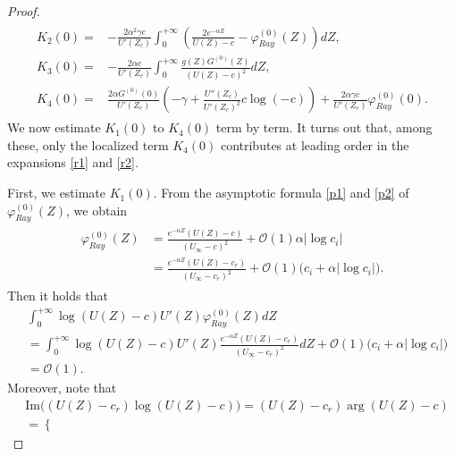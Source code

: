 \documentclass[10pt,a4paper]{amsart}
\begin{document}
\begin{proof}
\begin{align}
\begin{aligned}
					K_2(0)= &-\frac{2\alpha^2\gamma c}{U'(Z_c)}\int_{0}^{+\infty}\left(\frac{2e^{-\alpha Z}}{U(Z)-c}-\varphi_{Ray}^{(0)}(Z)\right)dZ,\\
					K_3(0)=&-\frac{2\alpha c}{U'(Z_c)}\int_{0}^{+\infty}\frac{g(Z)G^{(0)}(Z)}{(U(Z)-c)^2}dZ,\\
					K_4(0) =& \frac{2\alpha G^{(0)}(0)}{U'(Z_c)}\left(-\gamma+\frac{U''(Z_c)}{U'(Z_c)^2}c\log(-c)\right)
					+\frac{2\alpha\gamma c}{U'(Z_c)}\varphi_{Ray}^{(0)}(0).\nonumber
			\end{aligned}\end{align}
		We now estimate $K_1(0)$ to $K_4(0)$ term by term. It turns out that, among these, only the localized term $K_4(0)$ contributes at leading order in the expansions \eqref{r1} and \eqref{r2}.
		
	 First, we estimate $K_1(0)$.  From the asymptotic formula \eqref{p1} and \eqref{p2} of $\varphi^{(0)}_{Ray}(Z)$, we obtain 
			\begin{align}\begin{aligned}
					\varphi_{Ray}^{(0)}(Z)&=\frac{e^{-\alpha Z}(U(Z)-c)}{(U_\infty-c)^2}+\mathcal{O}(1)\alpha|\log c_i|\\
					&=\frac{e^{-\alpha Z}(U(Z)-c_r)}{(U_\infty-c_r)^2}+\mathcal{O}(1)\big(c_i+\alpha|\log c_i|\big).\nonumber
			\end{aligned}\end{align}
		Then it holds that
			\begin{align*}
				&\int_{0}^{+\infty}\log(U(Z)-c) U'(Z)\varphi_{Ray}^{(0)}(Z)dZ\\
				&= \int_{0}^{+\infty}\log(U(Z)-c) U'(Z)\frac{e^{-\alpha Z}(U(Z)-c_r)}{(U_\infty-c_r)^2}dZ+\mathcal{O}(1)\big(c_i+\alpha |\log c_i|\big)\\
				&=\mathcal{O}(1).
			\end{align*}
			Moreover, note that
			\begin{align*}
				&\text{Im}\Big((U(Z)-c_r)\log(U(Z)-c)\Big)= (U(Z)-c_r)\arg(U(Z)-c)\\
				&=\begin{cases}

\end{cases}
\end{align*}
\end{proof}
\end{document}
